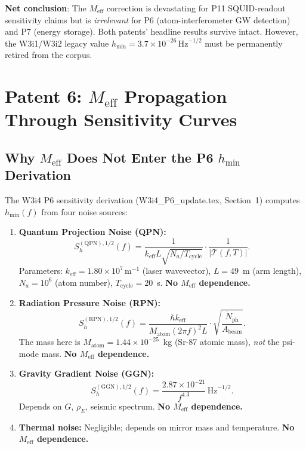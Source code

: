 \documentclass[11pt]{article}
\theoremstyle{definition}
\theoremstyle{remark}
\newcommand{\ee}[1]{\times10^{#1}}
\newcommand{\Meff}{M_{\mathrm{eff}}}
\newcommand{\sqrtHz}{\,\mathrm{Hz}^{-1/2}}
\begin{document}
\textbf{Net conclusion}: The $\Meff$ correction is devastating for P11
SQUID-readout sensitivity claims but is \emph{irrelevant} for P6
(atom-interferometer GW detection) and P7 (energy storage). Both patents'
headline results survive intact. However, the W3i1/W3i2 legacy value
$h_{\min} = 3.7\ee{-26}\sqrtHz$ must be permanently retired from
the corpus.

\section{Patent 6: $\Meff$ Propagation Through Sensitivity Curves}
\label{sec:P6}

\subsection{Why $\Meff$ Does Not Enter the P6 $h_{\min}$ Derivation}

The W3i4 P6 sensitivity derivation (W3i4\_P6\_update.tex, Section~1) computes
$h_{\min}(f)$ from four noise sources:

\begin{enumerate}
\item \textbf{Quantum Projection Noise (QPN):}
\begin{equation}
S_h^{(\mathrm{QPN}),1/2}(f) = \frac{1}{k_{\mathrm{eff}} L \sqrt{N_a / T_{\mathrm{cycle}}}}
\cdot \frac{1}{|\mathcal{T}(f,T)|}.
\end{equation}
Parameters: $k_{\mathrm{eff}} = 1.80\ee{7}\,\mathrm{m}^{-1}$ (laser wavevector),
$L = 49$~m (arm length), $N_a = 10^6$ (atom number), $T_{\mathrm{cycle}} = 20$~s.
\textbf{No $\Meff$ dependence.}

\item \textbf{Radiation Pressure Noise (RPN):}
\begin{equation}
S_h^{(\mathrm{RPN}),1/2}(f) = \frac{\hbar k_{\mathrm{eff}}}{M_{\mathrm{atom}} (2\pi f)^2 L}
\cdot \sqrt{\frac{\dot{N}_{\mathrm{ph}}}{A_{\mathrm{beam}}}}.
\end{equation}
The mass here is $M_{\mathrm{atom}} = 1.44\ee{-25}$~kg (Sr-87 atomic mass),
\emph{not} the psi-mode mass. \textbf{No $\Meff$ dependence.}

\item \textbf{Gravity Gradient Noise (GGN):}
\begin{equation}
S_h^{(\mathrm{GGN}),1/2}(f) = \frac{2.87\ee{-21}}{f^{4.3}}\sqrtHz.
\end{equation}
Depends on $G$, $\rho_E$, seismic spectrum. \textbf{No $\Meff$ dependence.}

\item \textbf{Thermal noise:} Negligible; depends on mirror mass and temperature.
\textbf{No $\Meff$ dependence.}
\end{enumerate}
\end{document}
